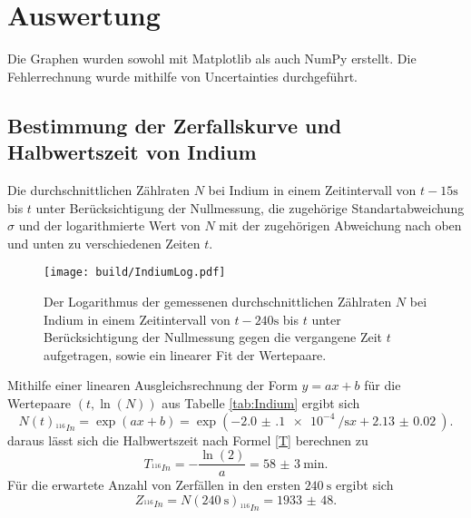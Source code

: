 \section{Auswertung}
\label{sec:Auswertung}


Die Graphen wurden sowohl mit Matplotlib \cite{matplotlib} als auch NumPy \cite{numpy} erstellt. Die
Fehlerrechnung wurde mithilfe von Uncertainties \cite{uncertainties} durchgeführt.


\subsection{Bestimmung der Zerfallskurve und Halbwertszeit von Indium}
 \begin{table}
  \centering
  \caption{Die durchschnittlichen Zählraten $N$ bei Indium in einem Zeitintervall von $t-15\si{\second}$ bis $t$ unter Berücksichtigung der Nullmessung, die zugehörige Standartabweichung $\sigma$ und der logarithmierte Wert von $N$ mit der zugehörigen Abweichung nach oben und unten zu verschiedenen Zeiten $t$.}
  
 \end{table}
\begin{figure}
	\centering
	\caption{Der Logarithmus der gemessenen durchschnittlichen Zählraten $N$ bei Indium in einem Zeitintervall von $t-240\si{\second}$ bis $t$ unter Berücksichtigung der Nullmessung gegen die vergangene Zeit $t$ aufgetragen, sowie ein linearer Fit der Wertepaare.}
	\texttt{[image: build/IndiumLog.pdf]}
	\label{fig:Indium}
\end{figure}
Mithilfe einer linearen Ausgleichsrechnung der Form $y=a x + b$ für die Wertepaare $(t, \ln(N))$ aus Tabelle \ref{tab:Indium} ergibt sich
\begin{displaymath}
	N(t)_{^{116}In}=\exp\left(a x + b\right)=\exp\left(\SI{-2.0(1)e-4}{\per\second} x + \SI{2.13(2)}{}\right)\text{.}
\end{displaymath}
daraus lässt sich die Halbwertszeit nach Formel \eqref{T} berechnen zu
\begin{displaymath}
	T_{^{116}In}=-\frac{\ln(2)}{a}=\SI{58(3)}{\minute}\text{.}
\end{displaymath}
Für die erwartete Anzahl von Zerfällen in den ersten $\SI{240}{\second}$ ergibt sich
\begin{displaymath}
	Z_{^{116}In} = N(\SI{240}{\second})_{^{116}In}=\num{1933(48)}\text{.}
\end{displaymath}

